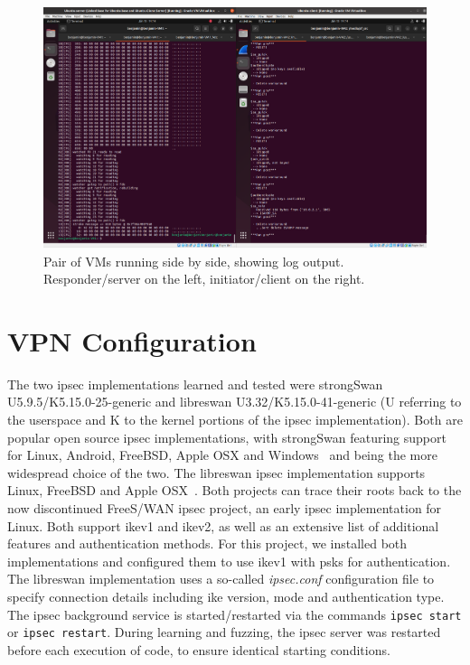 \begin{figure}
	\centering
	\includegraphics[width=\linewidth]{images/VM_setup}
	\caption{Pair of VMs running side by side, showing log output. Responder/server on the left, initiator/client on the right.}
	\label{fig:vmsetup}
\end{figure}


\section{VPN Configuration} \label{sec:vpn_setup}
The two \ac{ipsec} implementations learned and tested were strongSwan U5.9.5/K5.15.0-25-generic and libreswan U3.32/K5.15.0-41-generic (U referring to the userspace and K to the kernel portions of the ipsec implementation). Both are popular open source \ac{ipsec} implementations, with strongSwan featuring support for Linux, Android, FreeBSD, Apple OSX and Windows~\cite{doc:strongswan} and being the more widespread choice of the two. The libreswan \ac{ipsec} implementation supports Linux, FreeBSD and Apple OSX~\cite{doc:libreswan}. Both projects can trace their roots back to the now discontinued FreeS/WAN \ac{ipsec} project, an early \ac{ipsec} implementation for Linux. Both support \ac{ike}v1 and \ac{ike}v2, as well as an extensive list of additional features and authentication methods. For this project, we installed both implementations and configured them to use \ac{ike}v1 with \acp{psk} for authentication. The libreswan implementation uses a so-called \emph{ipsec.conf} configuration file to specify connection details including \ac{ike} version, mode and authentication type. The \ac{ipsec} background service is started/restarted via the commands \texttt{ipsec start} or \texttt{ipsec restart}. During learning and fuzzing, the \ac{ipsec} server was restarted before each execution of code, to ensure identical starting conditions. 
\newpage

